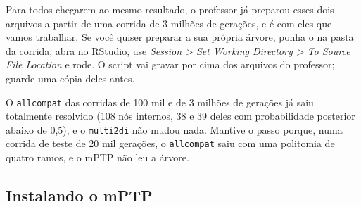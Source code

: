 \documentclass[11pt,a4paper]{article}
\newcommand{\arq}[1]{\path{#1}}
\newcommand{\ui}[1]{\textit{#1}}
\newcommand{\cmd}[1]{\texttt{#1}}
\begin{document}
Para todos chegarem ao mesmo resultado, o professor já preparou esses dois arquivos a partir de
uma corrida de 3 milhões de gerações, e é com eles que vamos trabalhar. Se você quiser preparar a
sua própria árvore, ponha o \arq{preparar_mptp.R} na pasta da corrida, abra no RStudio, use
\ui{Session > Set Working Directory > To Source File Location} e rode. O script vai gravar por
cima dos arquivos do professor; guarde uma cópia deles antes.

\begin{resposta}
O \cmd{allcompat} das corridas de 100 mil e de 3 milhões de gerações já saiu totalmente
resolvido (108 nós internos, 38 e 39 deles com probabilidade posterior abaixo de 0,5), e o
\cmd{multi2di} não mudou nada. Mantive o passo porque, numa corrida de teste de 20 mil
gerações, o \cmd{allcompat} saiu com uma politomia de quatro ramos, e o mPTP não leu a árvore.
\end{resposta}

\subsection{Instalando o mPTP}\label{sec:instalarmptp}
\end{document}
